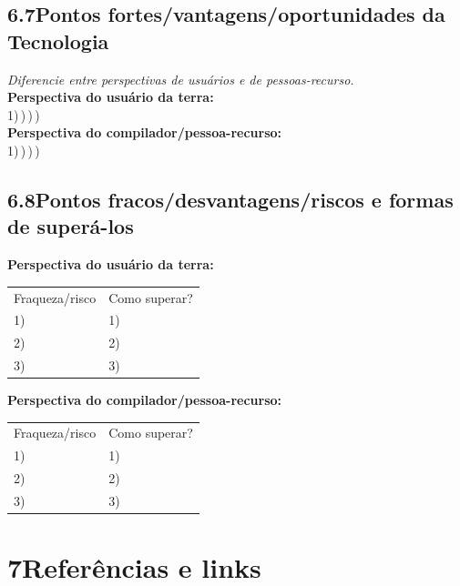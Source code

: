 \subsection{6.7\quad Pontos fortes/vantagens/oportunidades da Tecnologia}

\textit{Diferencie entre perspectivas de usuários e de pessoas-recurso.}\\[4pt]
\textbf{Perspectiva do usuário da terra:}\\
1)\,\dotfill {})\,\dotfill {})\,\dotfill {})\,\dotfill\\[4pt]
\textbf{Perspectiva do compilador/pessoa-recurso:}\\
1)\,\dotfill {})\,\dotfill {})\,\dotfill {})\,\dotfill

\subsection{6.8\quad Pontos fracos/desvantagens/riscos e formas de superá-los}

\textbf{Perspectiva do usuário da terra:}\\
\begin{tabular}{p{7cm}p{7cm}}
Fraqueza/risco & Como superar? \\
1)\,\dotfill & 1)\,\dotfill \\
2)\,\dotfill & 2)\,\dotfill \\
3)\,\dotfill & 3)\,\dotfill \\
\end{tabular}

\medskip\noindent
\textbf{Perspectiva do compilador/pessoa-recurso:}\\
\begin{tabular}{p{7cm}p{7cm}}
Fraqueza/risco & Como superar? \\
1)\,\dotfill & 1)\,\dotfill \\
2)\,\dotfill & 2)\,\dotfill \\
3)\,\dotfill & 3)\,\dotfill \\
\end{tabular}

\section{7\quad Referências e links}

